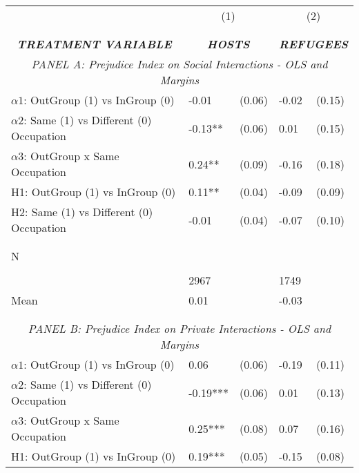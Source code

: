 \begin{tabular}{l*{4}{l}} \toprule 
                &\multicolumn{2}{c}{(1)}&\multicolumn{2}{c}{(2)}\\
                &\multicolumn{2}{c}{ } &\multicolumn{2}{c}{ } \\
\\[-0.6cm] \multicolumn{1}{c}{\textit{\textbf{TREATMENT VARIABLE}}} & \multicolumn{2}{c}{\textit{\textbf{HOSTS}}} & \multicolumn{2}{c}{\textit{\textbf{REFUGEES}}} \\  \multicolumn{5}{c}{\textit{PANEL A: Prejudice Index on Social Interactions - OLS and Margins}} \\  \midrule   
$\alpha1$: OutGroup (1) vs InGroup (0)&    -0.01   &   (0.06)&    -0.02   &   (0.15)\\
$\alpha2$: Same (1) vs Different (0) Occupation&    -0.13** &   (0.06)&     0.01   &   (0.15)\\
$\alpha3$: OutGroup x Same Occupation&     0.24** &   (0.09)&    -0.16   &   (0.18)\\
 
H1: OutGroup (1) vs InGroup (0)&     0.11** &   (0.04)&    -0.09   &   (0.09)\\
 
H2: Same (1) vs Different (0) Occupation&    -0.01   &   (0.04)&    -0.07   &   (0.10)\\
 
\\\\[-0.5cm] N \\\\[-0.6cm]&     2967   &         &     1749   &         \\
Mean            &     0.01&         &    -0.03&         \\
 
\\[-0.6cm] \\  \multicolumn{5}{c}{\textit{PANEL B: Prejudice Index on Private Interactions - OLS and Margins}} \\  \midrule    
$\alpha1$: OutGroup (1) vs InGroup (0)&     0.06   &   (0.06)&    -0.19   &   (0.11)\\
$\alpha2$: Same (1) vs Different (0) Occupation&    -0.19***&   (0.06)&     0.01   &   (0.13)\\
$\alpha3$: OutGroup x Same Occupation&     0.25***&   (0.08)&     0.07   &   (0.16)\\
 
H1: OutGroup (1) vs InGroup (0)&     0.19***&   (0.05)&    -0.15   &   (0.08)\\
 

\end{tabular}
